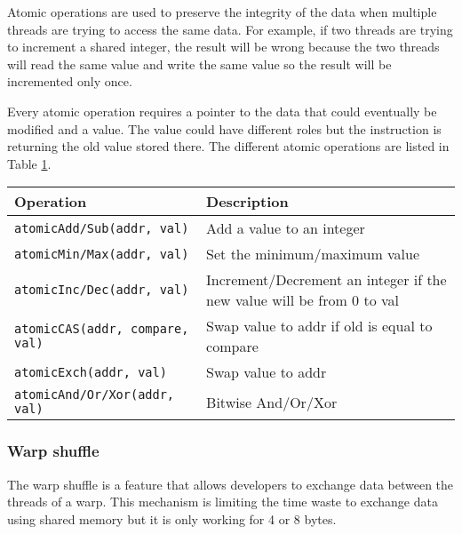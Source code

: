 Atomic operations are used to preserve the integrity of the data when multiple
threads are trying to access the same data.
For example, if two threads are trying to increment a shared integer,
the result will be wrong because the two threads will read the same value and write
the same value so the result will be incremented only once.

Every atomic operation requires a pointer to the data that could eventually be
modified and a value.
The value could have different roles but the instruction is returning
the old value stored there.
The different atomic operations are listed in Table \ref{tab:analyze:cuda:synchronization:atomic}.

\begin{table}[ht]
    \centering
    \begin{tabular}{|m{}|m{}|}
        \hline
        \textbf{Operation} & \textbf{Description} \\
        \hline
        \texttt{atomicAdd/Sub(addr, val)} & Add a value to an integer \\
        \hline
        \texttt{atomicMin/Max(addr, val)} & Set the minimum/maximum value \\
        \hline
        \texttt{atomicInc/Dec(addr, val)} & Increment/Decrement an integer if the new value will be from 0 to val\\
        \hline
        \texttt{atomicCAS(addr, compare, val)} & Swap value to addr if old is equal to compare\\
        \hline
        \texttt{atomicExch(addr, val)} & Swap value to addr \\
        \hline
        \texttt{atomicAnd/Or/Xor(addr, val)} & Bitwise And/Or/Xor \\
        \hline
    \end{tabular}
    \label{tab:analyze:cuda:synchronization:atomic}
\end{table}

\subsubsection{Warp shuffle}
\label{ch:analyze:cuda:synchronization:warp-shuffle}

The warp shuffle is a feature that allows developers to exchange data between the threads
of a warp.
This mechanism is limiting the time waste to exchange data using shared memory
but it is only working for 4 or 8 bytes.

